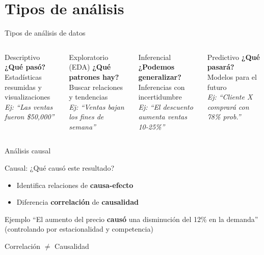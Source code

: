 \documentclass{beamer}
\begin{document}
\section{Tipos de análisis}

\begin{frame}{Tipos de análisis de datos}
\begin{columns}[t]
\begin{block}{Descriptivo}
\textbf{¿Qué pasó?}\\
Estadísticas resumidas y visualizaciones\\
\textit{Ej: ``Las ventas fueron \$50,000''}
\end{block}

\begin{block}{Exploratorio (EDA)}
\textbf{¿Qué patrones hay?}\\
Buscar relaciones y tendencias\\
\textit{Ej: ``Ventas bajan los fines de semana''}
\end{block}

\begin{block}{Inferencial}
\textbf{¿Podemos generalizar?}\\
Inferencias con incertidumbre\\
\textit{Ej: ``El descuento aumenta ventas 10-25\%''}
\end{block}

\begin{block}{Predictivo}
\textbf{¿Qué pasará?}\\
Modelos para el futuro\\
\textit{Ej: ``Cliente X comprará con 78\% prob.''}
\end{block}
\end{columns}
\end{frame}

\begin{frame}{Análisis causal}
\begin{alertblock}{Causal: ¿Qué causó este resultado?}
\begin{itemize}
    \item Identifica relaciones de \textbf{causa-efecto}
    \item Diferencia \textbf{correlación} de \textbf{causalidad}
\end{itemize}
\end{alertblock}

\begin{exampleblock}{Ejemplo}
``El aumento del precio \textbf{causó} una disminución del 12\% en la demanda''\\
(controlando por estacionalidad y competencia)
\end{exampleblock}

\vspace{0.5cm}
\begin{center}
\Large
\alert{Correlación $\neq$ Causalidad}
\end{center}
\end{frame}
\end{document}
